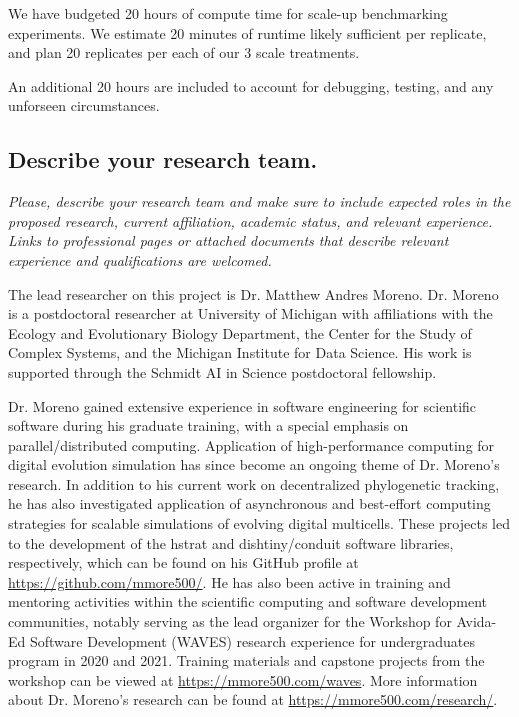 We have budgeted 20 hours of compute time for scale-up benchmarking experiments.
We estimate 20 minutes of runtime likely sufficient per replicate, and plan 20 replicates per each of our 3 scale treatments.

An additional 20 hours are included to account for debugging, testing, and any unforseen circumstances.

\subsection{Describe your research team.}

\begin{displayquote} \itshape
Please, describe your research team and make sure to include expected roles in the proposed research, current affiliation, academic status, and relevant experience.
Links to professional pages or attached documents that describe relevant experience and qualifications are welcomed.
\end{displayquote}

The lead researcher on this project is Dr. Matthew Andres Moreno.
Dr. Moreno is a postdoctoral researcher at University of Michigan with affiliations with the Ecology and Evolutionary Biology Department, the Center for the Study of Complex Systems, and the Michigan Institute for Data Science.
His work is supported through the Schmidt AI in Science postdoctoral fellowship.

Dr. Moreno gained extensive experience in software engineering for scientific software during his graduate training, with a special emphasis on parallel/distributed computing.
Application of high-performance computing for digital evolution simulation has since become an ongoing theme of Dr. Moreno's research.
In addition to his current work on decentralized phylogenetic tracking, he has also investigated application of asynchronous and best-effort computing strategies for scalable simulations of evolving digital multicells.
These projects led to the development of the hstrat and dishtiny/conduit software libraries, respectively, which can be found on his GitHub profile at \url{https://github.com/mmore500/}.
He has also been active in training and mentoring activities within the scientific computing and software development communities, notably serving as the lead organizer for the Workshop for Avida-Ed Software Development (WAVES) research experience for undergraduates program in 2020 and 2021.
Training materials and capstone projects from the workshop can be viewed at \url{https://mmore500.com/waves}.
More information about Dr. Moreno's research can be found at \url{https://mmore500.com/research/}.

